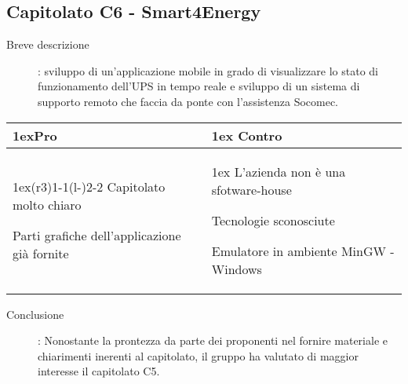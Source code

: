 \subsection{Capitolato C6 - Smart4Energy}
\begin{description}
\item [Breve descrizione]: sviluppo di un’applicazione mobile in grado di visualizzare lo stato di funzionamento dell’UPS in tempo reale e sviluppo di un sistema di supporto remoto che faccia da ponte con l'assistenza Socomec.
\end{description}
\begin{table}[h]
\begin{tabularx}{\linewidth}{>{\parskip1ex}X@{\kern4\tabcolsep}>{\parskip1ex}X}
\hfil\bfseries Pro
&
\hfil\bfseries Contro
\\\cmidrule(r{3\tabcolsep}){1-1}\cmidrule(l{-\tabcolsep}){2-2}
Capitolato molto chiaro \par
Parti grafiche dell'applicazione già fornite
&
L'azienda non è una sfotware-house \par
Tecnologie sconosciute \par
Emulatore in ambiente MinGW - Windows \\
\end{tabularx}
\end{table}
\begin{description}
	\item [Conclusione]: Nonostante la prontezza da parte dei proponenti nel fornire materiale e chiarimenti inerenti al capitolato, il gruppo ha valutato di maggior interesse il capitolato C5.
\end{description}